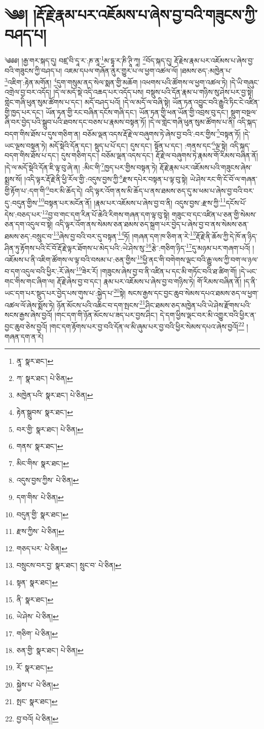 \setcounter{footnote}{0} 
\chapter{༄༅། །རྡོ་རྗེ་རྣམ་པར་འཇོམས་པ་ཞེས་བྱ་བའི་གཟུངས་ཀྱི་བཤད་པ།}༄༅༅། །རྒྱ་གར་སྐད་དུ། བཛྲ་བི་དཱ་ར་:ཎ་ནཱ་\footnote{ནཱ་  སྣར་ཐང་། }མ་དྷཱ་ར་ཎི་ཊཱི་ཀཱ། \footnote{ཀ་  སྣར་ཐང་།  པེ་ཅིན། }བོད་སྐད་དུ། རྡོ་རྗེས་རྣམ་པར་འཇོམས་པ་ཞེས་བྱ་བའི་གཟུངས་ཀྱི་བཤད་པ། འཇམ་དཔལ་གཞོན་ནུར་གྱུར་པ་ལ་ཕྱག་འཚལ་ལོ། །ཐམས་ཅད་:མཁྱེན་པ་\footnote{མཁྱེན་པའི་  སྣར་ཐང་།  པེ་ཅིན། }འཇིག་:རྟེན་མགོན། \footnote{རྟེན་སྒྲུབས་  སྣར་ཐང་། }དུག་གསུམ་ནད་སེལ་སྨན་གྱི་མཆོག །འཕགས་པའི་ཚོགས་ལ་ཕྱག་འཚལ་ཏེ། །དེ་ཡི་གཞུང་འགྲེལ་བྱ་བར་འདོད། །དེ་ལ་མདོ་སྡེ་འདི་འཆད་པར་འདོད་པས། བསྡུས་པའི་དོན་རྣམ་པ་གཉིས་སུ་ཤེས་པར་བྱ་སྟེ། གླེང་གཞི་ཕུན་སུམ་ཚོགས་པ་དང་། མདོ་བཤད་པའོ། །དེ་ལ་མདོ་ལ་བཞི་སྟེ། ཡོན་ཏན་འབྱུང་བའི་རྒྱུའི་ཏིང་ངེ་འཛིན་གྱི་ཁྱད་པར་དང་། ཡོན་ཏན་གྱི་རང་བཞིན་དངོས་གཞི་དང་། ཡོན་ཏན་གྱི་ཕན་ཡོན་གྱི་འབྲས་བུ་དང་། སྡུག་བསྔལ་ཞི་བར་བྱེད་པའི་སྒྲུབ་པའི་ཐབས་དང་བཅས་པ་རྣམས་བསྟན་ཏོ། །དེ་ལ་གླེང་གཞི་ཕུན་སུམ་ཚོགས་པ་ནི། འདི་སྐད་བདག་གིས་ཐོས་པ་དུས་གཅིག་ན། བཅོམ་ལྡན་འདས་རྡོ་རྗེ་ལ་བཞུགས་ཏེ་ཞེས་བྱ་བའི་:བར་གྱིས་\footnote{བར་གྱི་  སྣར་ཐང་།  པེ་ཅིན། }བསྟན་ཏོ། །དེ་ཡང་ལྔས་བསྟན་ཏེ། མདོ་སྡེའི་དོན་དང་། སྡུད་པ་པོ་དང་། དུས་དང་། སྟོན་པ་དང་། :གནས་དང་\footnote{གནས་  སྣར་ཐང་། }ལྔ་སྟེ། འདི་སྐད་བདག་གིས་ཐོས་པ་དང་། དུས་གཅིག་དང་། བཅོམ་ལྡན་འདས་དང་། རྡོ་རྗེ་ལ་བཞུགས་ཏེ་རྣམས་གོ་རིམས་བཞིན་ནོ། །དེ་ལ་མདོ་སྡེའི་དོན་ཇི་ལྟ་བུ་ཞེ་ན། :མིང་གི་\footnote{མིང་གིས་  སྣར་ཐང་། }ཁྱད་པར་གྱིས་བསྟན་ཏེ། རྡོ་རྗེ་རྣམ་པར་འཇོམས་པའི་གཟུངས་ཞེས་སྨྲས་སོ། །འདི་ལྟར་རྡོ་རྗེ་ནི་ཕྱི་རོལ་གྱི་:འདུས་བྱས་ཀྱི་\footnote{འདུས་བྱས་ཀྱིས་  པེ་ཅིན། }རྫས་དཔེར་བསྟན་པ་ལྟ་བུ་སྟེ། ཡེ་ཤེས་རང་གི་ངོ་བོ་ལ་གཞན་གྱི་རྟོག་པ་:དག་གི་\footnote{དག་གིས་  པེ་ཅིན། }བར་མི་ཆོད་དེ། འདི་ལྟར་འོག་ནས་མི་ཆོད་པ་ནས་ཐམས་ཅད་དུ་མ་ཕམ་པ་ཞེས་བྱ་བའི་བར་དུ་:བདུན་གྱིས་\footnote{བདུན་གྱི་  སྣར་ཐང་། }བསྟན་པར་མངོན་ནོ། །རྣམ་པར་འཇོམས་པ་ཞེས་བྱ་བ་ནི། འདུས་བྱས་:རྫས་ཀྱི་\footnote{རྫས་ཀྱིས་  པེ་ཅིན། }དངོས་པོ་དེས་:བཅད་པར་\footnote{གཅད་པར་  པེ་ཅིན། }བྱ་བ་གང་དག་རིན་པོ་ཆེའི་རིགས་གཞན་དག་ལྟ་བུ་སྟེ། གཟུང་བ་དང་འཛིན་པ་ཅན་གྱི་སེམས་ཅན་དག་འདུལ་བ་སྟེ། འདི་ལྟར་འོག་ནས་སེམས་ཅན་ཐམས་ཅད་སྐྲག་པར་བྱེད་པ་ཞེས་བྱ་བ་ནས་སེམས་ཅན་ཐམས་ཅད་:བསྲུང་བ་\footnote{བསྲུངས་བར་བྱ་  སྣར་ཐང་། སྲུང་བ་  པེ་ཅིན། }ཞེས་བྱ་བའི་བར་དུ་བསྟན་\footnote{སྟན་  སྣར་ཐང་། }ཏོ། །གཞན་དག་ཁ་ཅིག་ན་རེ་\footnote{ནི་  སྣར་ཐང་། }རྡོ་རྗེ་ནི་ཆོས་ཀྱི་དེ་ཁོ་ན་ཉིད་ཤིན་ཏུ་རྟོགས་པའི་ངོ་བོ་རྡོ་རྗེ་ལྟར་ཐོགས་པ་མེད་པའི་:ཡེ་ཤེས་སུ་\footnote{ཡེ་ཤེས་  པེ་ཅིན། }རྩེ་:གཅིག་ཉིད་\footnote{གཅིག་  པེ་ཅིན། }དུ་མཉམ་པར་གཞག་པའོ། །འཇོམས་པ་ནི་འཇིག་ཚོགས་ལ་ལྟ་བའི་བསམ་པ་:ཅན་གྱིས་\footnote{ཅན་གྱི་  སྣར་ཐང་།  པེ་ཅིན། }ཕྱི་ནང་གི་བགེགས་ལྡང་བའི་རྒྱུ་ལས་ཀྱི་བག་ལ་ཉལ་བ་དག་འདུལ་བའི་ཕྱིར་:རོ་ཞེས་\footnote{རོ་  སྣར་ཐང་། }ཟེར་རོ། །གཟུངས་ཞེས་བྱ་བ་ནི་འཛིན་པ་དང་མི་གཏོང་བའི་ཐ་ཚིག་གོ། །དེ་ཡང་གང་གིས་གང་ཞིག་ལ། རྡོ་རྗེ་ཞེས་བྱ་བ་དང་། རྣམ་པར་འཇོམས་པ་ཞེས་བྱ་བ་གཉིས་ཏེ། གོ་རིམས་བཞིན་ནོ། །ད་ནི་ཡང་དག་པར་སྡུད་པར་བྱེད་པས་གུས་པ་:སྐྱེད་པ་\footnote{སྐྱེས་པ་  པེ་ཅིན། }སྟེ། སངས་རྒྱས་དང་བྱང་ཆུབ་སེམས་དཔའ་ཐམས་ཅད་ལ་ཕྱག་འཚལ་ལོ་ཞེས་སྨོས་ཏེ། ཉོན་མོངས་པའི་འཆིང་བ་དག་སྤངས་\footnote{སྤང་  སྣར་ཐང་། }ཤིང་ཐམས་ཅད་མཁྱེན་པའི་ཡེ་ཤེས་རྫོགས་པའི་སངས་རྒྱས་ཞེས་བྱའོ། །གང་དག་གི་ཉོན་མོངས་པ་ཟད་པར་བྱས་ཤིང་། དེ་དག་ཕྱིས་ལྡང་བར་མི་འགྱུར་བའི་ཕྱིར་ན་བྱང་ཆུབ་ཅེས་བྱའོ། །གང་དག་རྟོགས་པར་བྱ་བའི་དོན་ལ་མི་ཞུམ་པར་བྱ་བའི་ཕྱིར་སེམས་དཔའ་ཞེས་བྱའོ།\footnote{བྱ་བའོ།  པེ་ཅིན། } །གཞན་དག་ན་རེ། 